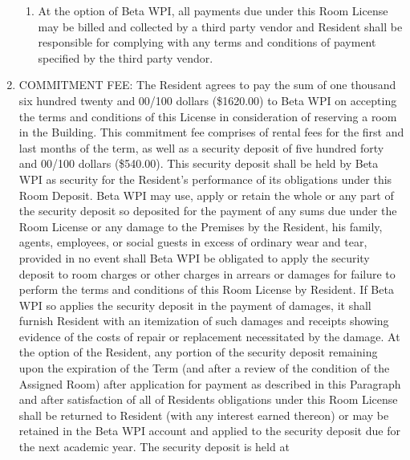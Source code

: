 \documentclass[legalpaper, 12pt]{article}
\begin{document}
\begin{enumerate}
\begin{enumerate}[label=\Alph*.]
                \item At the option of Beta WPI, all payments due under this
                        Room License may be billed and collected by a third
                        party vendor and Resident shall be responsible for
                        complying with any terms and conditions of payment
                        specified by the third party vendor.

        \end{enumerate} 

        \item COMMITMENT FEE\@: The Resident agrees to pay the sum of one thousand
                six hundred twenty and 00/100 dollars (\$1620.00) to Beta WPI on
                accepting the terms and conditions of this License in
                consideration of reserving a room in the Building.  This
                commitment fee comprises of rental fees for the first and last
                months of the term, as well as a security deposit of five
                hundred forty and 00/100 dollars (\$540.00). This security
                deposit shall be held by Beta WPI as security for the Resident’s
                performance of its obligations under this Room Deposit.  Beta
                WPI may use, apply or retain the whole or any part of the
                security deposit so deposited for the payment of any sums due
                under the Room License or any damage to the Premises by the
                Resident, his family, agents, employees, or social guests in
                excess of ordinary wear and tear, provided in no event shall
                Beta WPI be obligated to apply the security deposit to room
                charges or other charges in arrears or damages for failure to
                perform the terms and conditions of this Room License by
                Resident. If Beta WPI so applies the security deposit in the
                payment of damages, it shall furnish Resident with an
                itemization of such damages and receipts showing evidence of the
                costs of repair or replacement necessitated by the damage.  At
                the option of the Resident, any portion of the security deposit
                remaining upon the expiration of the Term (and after a review of
                the condition of the Assigned Room) after application for
                payment as described in this Paragraph and after satisfaction of
                all of Residents obligations under this Room License shall be
                returned to Resident (with any interest earned thereon) or may
                be retained in the Beta WPI account and applied to the security
                deposit due for the next academic year.  The security deposit is
                held at\\ 


\end{enumerate}
\end{document}
